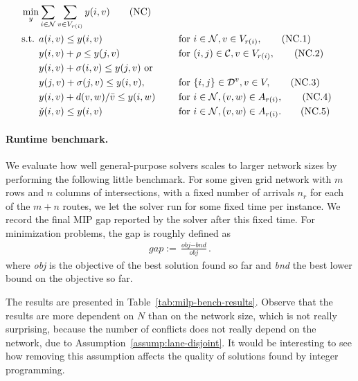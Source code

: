 \documentclass{report}
\theoremstyle{definition}
\theoremstyle{plain}
\begin{document}
\begin{alignat}{3}
  \min_{y} & \sum_{i \in \mathcal{N}} \sum_{v \in V_{r(i)}} y(i, v) \tag{NC} \label{NC} \\
  \text{ s.t. } & a(i, v) \leq y(i, v) && \text{ for } i \in \mathcal{N}, v \in V_{r(i)} , \tag{NC.1}\label{eq:travel} \\
                & y(i, v) + \rho \leq y(j, v) && \text{ for } (i, j) \in \mathcal{C}, v \in V_{r(i)} , \tag{NC.2} \\
                & y(i,v) + \sigma(i,v) \leq y(j,v) \text{ or } \quad \notag \\
                & y(j,v) + \sigma(j,v) \leq y(i,v) , && \text{ for } \{i,j\} \in \mathcal{D}^{v}, v \in V, \tag{NC.3} \label{eq:network-disj} \\
                & y(i, v) + d(v,w) / \bar{v} \leq y(i, w) && \text{ for } i \in \mathcal{N} , (v,w) \in A_{r(i)}, \tag{NC.4} \label{eq:travel} \\
                & \check{y}(i, v) \leq y(i, v) && \text{ for  } i \in \mathcal{N}, (v,w ) \in A_{r(i)} . \tag{NC.5} \label{eq:buffer}
\end{alignat}

\paragraph{Runtime benchmark.}

We evaluate how well general-purpose solvers scales to larger network sizes by
performing the following little benchmark.
%
For some given grid network with $m$ rows and $n$ columns of intersections, with
a fixed number of arrivals $n_r$ for each of the $m+n$ routes, we let the solver
run for some fixed time per instance.
%
We record the final MIP gap reported by the solver after this fixed time.
For minimization problems, the gap is roughly defined as
\begin{align*}
  gap := \frac{\textit{obj} - \textit{bnd}}{\textit{obj}} .
\end{align*}
where \emph{obj} is the objective of the best solution found so far and
\emph{bnd} the best lower bound on the objective so far.

The results are presented in Table~\ref{tab:milp-bench-results}. Observe that
the results are more dependent on $N$ than on the network size, which is not
really surprising, because the number of conflicts does not really depend on the
network, due to Assumption~\ref{assump:lane-disjoint}.
%
It would be interesting to see how removing this assumption affects the quality
of solutions found by integer programming.
\end{document}
